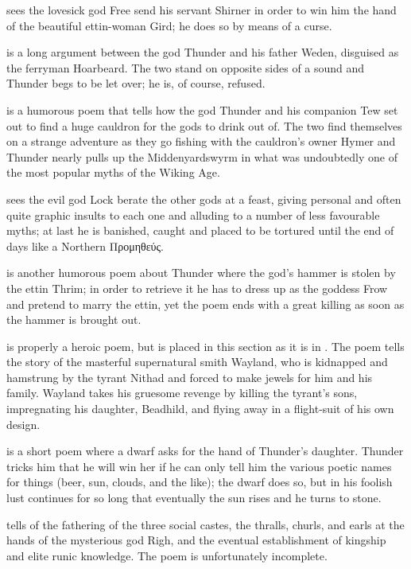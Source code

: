  sees the lovesick god Free send his servant Shirner in order to win him the hand of the beautiful ettin-woman Gird; he does so by means of a curse.

 is a long argument between the god Thunder and his father Weden, disguised as the ferryman Hoarbeard.  The two stand on opposite sides of a sound and Thunder begs to be let over; he is, of course, refused.

 is a humorous poem that tells how the god Thunder and his companion Tew set out to find a huge cauldron for the gods to drink out of.  The two find themselves on a strange adventure as they go fishing with the cauldron’s owner Hymer and Thunder nearly pulls up the Middenyardswyrm in what was undoubtedly one of the most popular myths of the Wiking Age.

 sees the evil god Lock berate the other gods at a feast, giving personal and often quite graphic insults to each one and alluding to a number of less favourable myths; at last he is banished, caught and placed to be tortured until the end of days like a Northern \textgreek{Προμηθεύς}.

 is another humorous poem about Thunder where the god’s hammer is stolen by the ettin Thrim; in order to retrieve it he has to dress up as the goddess Frow and pretend to marry the ettin, yet the poem ends with a great killing as soon as the hammer is brought out.

 is properly a heroic poem, but is placed in this section as it is in \Regius.  The poem tells the story of the masterful supernatural smith Wayland, who is kidnapped and hamstrung by the tyrant Nithad and forced to make jewels for him and his family.  Wayland takes his gruesome revenge by killing the tyrant’s sons, impregnating his daughter, Beadhild, and flying away in a flight-suit of his own design.

 is a short poem where a dwarf asks for the hand of Thunder’s daughter.  Thunder tricks him that he will win her if he can only tell him the various poetic names for things (beer, sun, clouds, and the like); the dwarf does so, but in his foolish lust continues for so long that eventually the sun rises and he turns to stone.

 tells of the fathering of the three social castes, the thralls, churls, and earls at the hands of the mysterious god Righ, and the eventual establishment of kingship and elite runic knowledge.  The poem is unfortunately incomplete.

